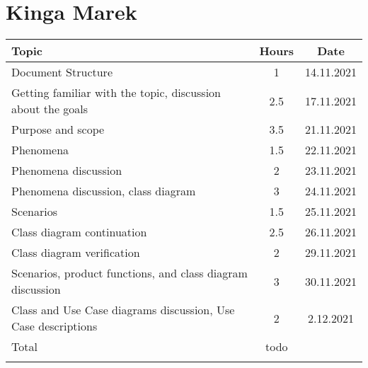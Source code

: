 \section*{Kinga Marek}
\begin{table}[H]
    \centering
    \begin{tabular}{lcc} \Xhline{1.5pt}
        Topic &  Hours & Date \\ \hline
        Document Structure & 1 & 14.11.2021 \\ 
        Getting familiar with the topic, discussion about the goals & 2.5 & 17.11.2021 \\ 
        Purpose and scope & 3.5 & 21.11.2021 \\
        Phenomena & 1.5 & 22.11.2021 \\ 
        Phenomena discussion & 2 & 23.11.2021 \\
        Phenomena discussion, class diagram & 3 & 24.11.2021 \\ 
        Scenarios & 1.5 & 25.11.2021 \\ 
        Class diagram continuation & 2.5 & 26.11.2021 \\
        Class diagram verification & 2 & 29.11.2021 \\
        Scenarios, product functions, and class diagram discussion & 3 & 30.11.2021\\ 
        Class and Use Case diagrams discussion, Use Case descriptions & 2 & 2.12.2021\\ \hline
        Total & todo & \\ \Xhline{1.5pt}
    \end{tabular}
\end{table}